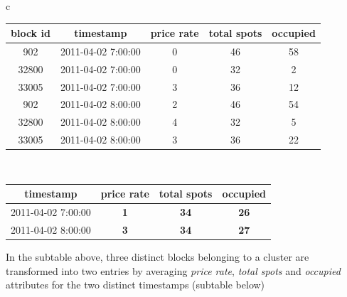 \begin{table}
	{\begin{tabular}{ c }
			\begin{tabular}{ | c | c | c | c | c |}
				\hline
				\textbf{block id} & \textbf{timestamp} & \textbf{price rate} & \textbf{total spots} & \textbf{occupied} \\ \hline
				902   & {2011-04-02 7:00:00} & 0 & 46 & 58 \\ \hline
				32800 & {2011-04-02 7:00:00} & 0 & 32 & 2 \\ \hline
				33005 & {2011-04-02 7:00:00} & 3 & 36 & 12 \\ \hline
				902   & {2011-04-02 8:00:00} & 2 & 46 & 54 \\ \hline
				32800 & {2011-04-02 8:00:00} & 4 & 32 & 5 \\ \hline
				33005 & {2011-04-02 8:00:00} & 3 & 36 & 22 \\ \hline
			\end{tabular} \\
			\colrule
			\begin{tabular}{ | c | c | c | c |}
				\hline
				\textbf{timestamp} & \textbf{price rate} & \textbf{total spots} & \textbf{occupied} \\ \hline
				{2011-04-02 7:00:00} & \textbf{1} & \textbf{34} & \textbf{26} \\ \hline
				{2011-04-02 8:00:00} & \textbf{3} & \textbf{34} & \textbf{27} \\ \hline
			\end{tabular}
	\end{tabular}}
	\begin{tabnote}
		In the subtable above, three distinct blocks belonging to a cluster are transformed into two entries by averaging \textit{price rate}, \textit{total spots} and \textit{occupied} attributes for the two distinct timestamps (subtable below)
	\end{tabnote}
	\label{tab:aggregating_datapoints}
\end{table}

